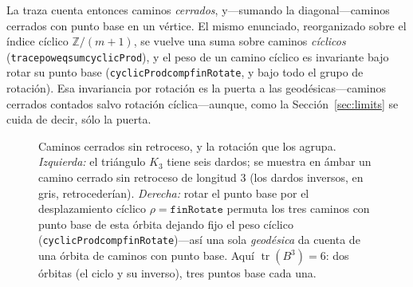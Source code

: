 \documentclass[11pt]{article}
\newcommand{\lean}[1]{{\def\_{\textunderscore\allowbreak}\texttt{#1}}}
\newcommand{\Z}{\mathbb{Z}}
\newcommand{\tr}{\operatorname{tr}}
\begin{document}
La traza cuenta entonces caminos \emph{cerrados}, y---sumando la diagonal---caminos cerrados con punto
base en un v\'ertice. El mismo enunciado, reorganizado sobre el \'indice c\'iclico $\Z/(m{+}1)$, se
vuelve una suma sobre caminos \emph{c\'iclicos} (\lean{trace\_pow\_eq\_sum\_cyclicProd}), y el peso de
un camino c\'iclico es invariante bajo rotar su punto base
(\lean{cyclicProd\_comp\_finRotate}, y bajo todo el grupo de rotaci\'on). Esa invariancia por
rotaci\'on es la puerta a las geod\'esicas---caminos cerrados contados salvo rotaci\'on
c\'iclica---aunque, como la Secci\'on~\ref{sec:limits} se cuida de decir, s\'olo la puerta.

\begin{figure}[h]
\centering
{}
\caption{Caminos cerrados sin retroceso, y la rotaci\'on que los agrupa. \emph{Izquierda:} el
tri\'angulo $K_3$ tiene seis dardos; se muestra en \'ambar un camino cerrado sin retroceso de longitud
$3$ (los dardos inversos, en gris, retroceder\'ian). \emph{Derecha:} rotar el punto base por el
desplazamiento c\'iclico $\rho=\mathtt{finRotate}$ permuta los tres caminos con punto base de esta
\'orbita dejando fijo el peso c\'iclico (\lean{cyclicProd\_comp\_finRotate})---as\'i una sola
\emph{geod\'esica} da cuenta de una \'orbita de caminos con punto base. Aqu\'i $\tr(B^3)=6$: dos
\'orbitas (el ciclo y su inverso), tres puntos base cada una.}
\label{fig:cyclic}
\end{figure}
\end{document}

